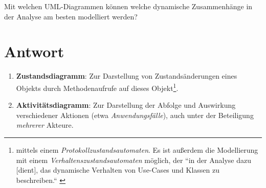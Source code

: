Mit welchen UML-Diagrammen können welche dynamische Zusammenhänge in der Analyse am besten modelliert werden?


\section*{Antwort}

\begin{enumerate}
    \item \textbf{Zustandsdiagramm}: Zur Darstellung von Zustandsänderungen eines Objekts durch Methodenaufrufe auf dieses Objekt\footnote{
    mittels einem \textit{Protokollzustandsautomaten}.
    Es ist außerdem die Modellierung mit einem \textit{Verhaltenszustandsautomaten} möglich, der  ``in der Analyse dazu [dient], das dynamische Verhalten von Use-Cases und Klassen zu beschreiben.`` \cite[548]{Bal05}
    }.
    \item \textbf{Aktivitätsdiagramm}: Zur Darstellung der Abfolge und Auswirkung verschiedener Aktionen (etwa \textit{Anwendungsfälle}), auch unter der Beteiligung \textit{mehrerer} Akteure.

\end{enumerate}